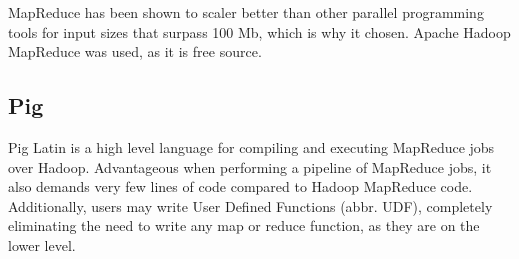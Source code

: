 \documentclass[../../main.tex]{subfiles}
\begin{document}
MapReduce has been shown to scaler better than other parallel programming tools for input sizes that surpass 100 Mb, which is why it chosen.\cite{compForkMapRed} Apache Hadoop MapReduce was used, as it is free source.

\subsection{Pig}
Pig Latin is a high level language for compiling and executing MapReduce jobs over Hadoop. Advantageous when performing a pipeline of MapReduce jobs\cite{pig}, it also demands very few lines of code compared to Hadoop MapReduce code. Additionally, users may write User Defined Functions (abbr. UDF), completely eliminating the need to write any map or reduce function, as they are on the lower level.  


 
\end{document}
